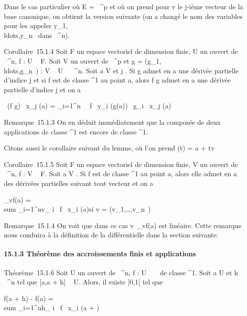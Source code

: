 \documentclass[]{article}
\begin{document}
Dans le cas particulier où E = ~^p et où on prend pour v le
j-ième vecteur de la base canonique, on obtient la version suivante (on
a changé le nom des variables pour les appeler
y_1,\\ldots,y_n~
dans ~^n).

Corollaire~15.1.4 Soit F un espace vectoriel de dimension finie, U un
ouvert de ~^n, f : U \rightarrow~ F. Soit V un ouvert de ~^p
et g =
(g_1,\\ldots,g_n~)
: V \rightarrow~ U \subset~ ~^n. Soit a \in V et j \in [1,p]. Si g admet en a
une dérivée partielle d'indice j et si f est de classe ^1 au
point a, alors f \cdot g admet en a une dérivée partielle d'indice j et on a

 \partial~(f \cdot g) \over \partial~x_j (a) =
\sum _i=1^n~ \partial~f
\over \partial~y_i (g(a)) \partial~g_i
\over \partial~x_j (a)

Remarque~15.1.3 On en déduit immédiatement que la composée de deux
applications de classe ^1 est encore de classe
^1.

Citons aussi le corollaire suivant du lemme, où l'on prend \phi(t) = a + tv

Corollaire~15.1.5 Soit F un espace vectoriel de dimension finie, V un
ouvert de ~^n, f : V \rightarrow~ F. Soit a \in V . Si f est de classe
^1 au point a, alors elle admet en a des dérivées partielles
suivant tout vecteur et on a

\partial_vf(a) = \\sum
_i=1^nv_ i \partial~f \over
\partial~x_i (a)\qquad \text si v =
(v_1,\ldots,v_n~)

Remarque~15.1.4 On voit que dans ce cas
v\mapsto~\partial_vf(a) est linéaire. Cette
remarque nous conduira à la définition de la différentielle dans la
section suivante.

\paragraph{15.1.3 Théorème des accroissements finis et applications}

Théorème~15.1.6 Soit U un ouvert de ~^n, f : U \rightarrow~ ~ de classe
^1. Soit a \in U et h \in {}~^n tel que [a,a + h] \subset~
U. Alors, il existe \theta \in]0,1[ tel que

f(a + h) - f(a) = \\sum
_i=1^nh_ i \partial~f \over
\partial~x_i (a + \thetah)
\end{document}
